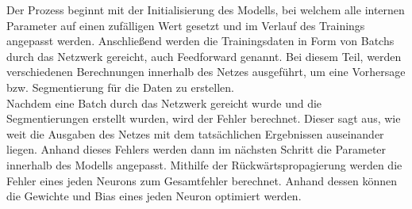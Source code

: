 Der Prozess beginnt mit der Initialisierung des \gls{Modell}s, bei welchem alle internen Parameter auf einen zufälligen Wert gesetzt und im Verlauf des Trainings angepasst werden. Anschließend werden die Trainingsdaten in Form von \glspl{Batch} durch das Netzwerk gereicht, auch Feedforward genannt. Bei diesem Teil, werden verschiedenen Berechnungen innerhalb des Netzes ausgeführt, um eine Vorhersage bzw. Segmentierung für die Daten zu erstellen.\\
Nachdem eine \gls{Batch} durch das Netzwerk gereicht wurde und die Segmentierungen erstellt wurden, wird der Fehler berechnet. Dieser sagt aus, wie weit die Ausgaben des Netzes mit dem tatsächlichen Ergebnissen auseinander liegen. Anhand dieses Fehlers werden dann im nächsten Schritt die Parameter innerhalb des \gls{Modell}s angepasst. Mithilfe der Rückwärtspropagierung werden die Fehler eines jeden Neurons zum Gesamtfehler berechnet. Anhand dessen können die Gewichte und Bias eines jeden Neuron optimiert werden. \cite[vgl.][]{Goodfellow2016}